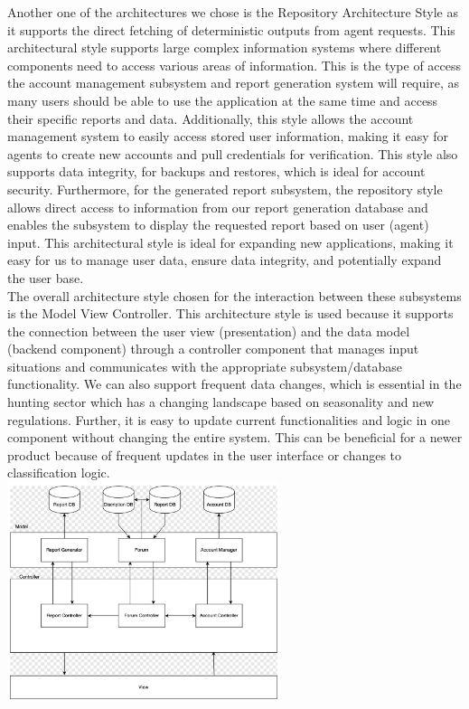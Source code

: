 \documentclass[]{article}
\begin{document}
Another one of the architectures we chose is the Repository Architecture Style as it supports the direct fetching of deterministic outputs from agent requests. This architectural style supports large complex information systems where different components need to access various areas of information. This is the type of access the account management subsystem and report generation system will require, as many users should be able to use the application at the same time and access their specific reports and data. Additionally, this style allows the account management system to easily access stored user information, making it easy for agents to create new accounts and pull credentials for verification. This style also supports data integrity, for backups and restores, which is ideal for account security. Furthermore, for the generated report subsystem, the repository style allows direct access to information from our report generation database and enables the subsystem to display the requested report based on user (agent) input. This architectural style is ideal for expanding new applications, making it easy for us to manage user data, ensure data integrity, and potentially expand the user base.
\\

The overall architecture style chosen for the interaction between these subsystems is the Model View Controller. This architecture style is used because it supports the connection between the user view (presentation) and the data model (backend component) through a controller component that manages input situations and communicates with the appropriate subsystem/database functionality. We can also support frequent data changes, which is essential in the hunting sector which has a changing landscape based on seasonality and new regulations. Further, it is easy to update current functionalities and logic in one component without changing the entire system. This can be beneficial for a newer product because of frequent updates in the user interface or changes to classification logic.  
\\

\includegraphics[width=0.6\textwidth]{architecture.png}
\end{document}
